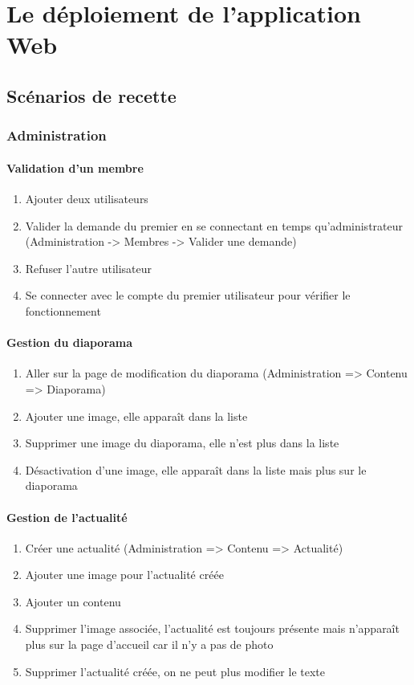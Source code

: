 \documentclass[11pt]{report}
\begin{document}
\chapter{Le déploiement de l'application Web}
\section{Scénarios de recette}
\subsection{Administration}
\subsubsection*{Validation d'un membre}
\begin{enumerate}
\item Ajouter deux utilisateurs
\item Valider la demande du premier en se connectant en temps qu'administrateur 
(Administration -> Membres -> Valider une demande)
\item Refuser l’autre utilisateur
\item Se connecter avec le compte du premier utilisateur pour vérifier le 
fonctionnement
\end{enumerate}
\subsubsection*{Gestion du diaporama}
\begin{enumerate}
\item Aller sur la page de modification du diaporama (Administration => Contenu 
=> Diaporama)
\item Ajouter une image, elle apparaît dans la liste
\item Supprimer une image du diaporama, elle n'est plus dans la liste
\item Désactivation d’une image, elle apparaît dans la liste mais plus sur le 
diaporama
\end{enumerate}
\subsubsection*{Gestion de l'actualité}
\begin{enumerate}
\item Créer une actualité (Administration => Contenu => Actualité)
\item Ajouter une image pour l’actualité créée
\item Ajouter un contenu
\item Supprimer l’image associée, l'actualité est toujours présente mais 
n’apparaît plus sur la page d'accueil car il n'y a pas de photo
\item Supprimer l’actualité créée, on ne peut plus modifier le texte
\end{enumerate}
\end{document}
